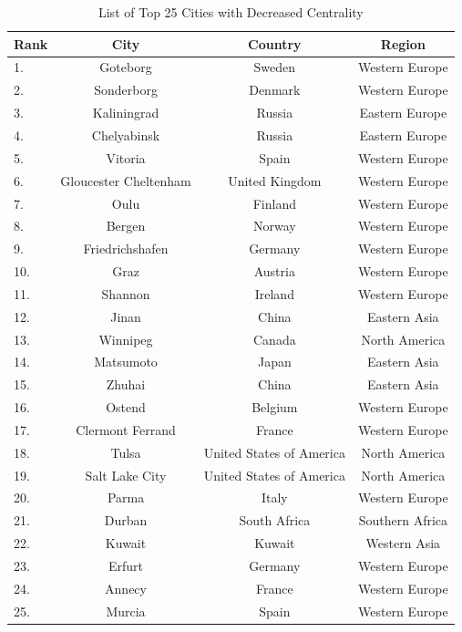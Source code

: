 \begin{table}[ht]
	\centering
	\caption{List of Top 25 Cities with Decreased Centrality}
	\begin{scriptsize}
	\begin{tabular}{|l|c|c|c|}
	\hline \textbf{Rank} & \textbf{City} & \textbf{Country} & \textbf{Region}  			\\   
	\hline 
	 1. & Goteborg 		    & Sweden				 			& Western Europe 		\\	
	 2. & Sonderborg   		& Denmark		 					& Western Europe  		\\	
	 3. & Kaliningrad 		& Russia				 			& Eastern Europe 		\\	
	 4. & Chelyabinsk 		& Russia 							& Eastern Europe 		\\	
	 5. & Vitoria	 		& Spain					 			& Western Europe 		\\	
	 6. & Gloucester Cheltenham 	& United Kingdom 			& Western Europe 		\\	 			
	 7. & Oulu				& Finland				 			& Western Europe 		\\	 			
	 8. & Bergen 			& Norway			 				& Western Europe		\\	
	 9. & Friedrichshafen 	& Germany				 			& Western Europe		\\	
	 10. & Graz				& Austria 							& Western Europe		\\	
	 11. & Shannon	 		& Ireland							& Western Europe		\\	
	 12. & Jinan 			& China				 				& Eastern Asia			\\	
	 13. & Winnipeg 		& Canada							& North America			\\	
	 14. & Matsumoto	 	& Japan				 				& Eastern Asia			\\	
	 15. & Zhuhai	  		& China		 						& Eastern Asia			\\ 				
	 16. & Ostend 			& Belgium							& Western Europe		\\	
	 17. & Clermont Ferrand	& France 							& Western Europe		\\	
	 18. & Tulsa 			& United States of America			& North America   		\\
	 19. & Salt Lake City	& United States of America			& North America   		\\
	 20. & Parma	 		& Italy				 				& Western Europe		\\	
	 21. & Durban	 		& South Africa 						& Southern Africa		\\	
	 22. & Kuwait 			& Kuwait			  				& Western Asia	 		\\
	 23. & Erfurt			& Germany					  		& Western Europe 		\\
	 24. & Annecy			& France					  		& Western Europe   		\\
	 25. & Murcia	 		& Spain  							& Western Europe   		\\
	\hline
	\end{tabular} 
	\end{scriptsize}
	\label{tab:appendix-B-centrality-decreasing}
\end{table}


